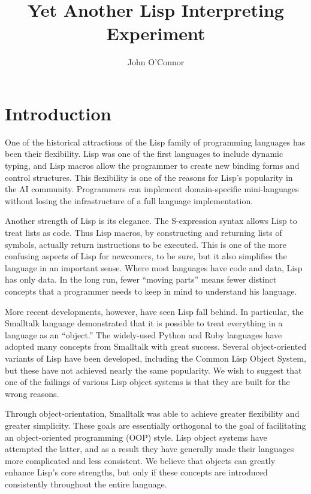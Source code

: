 \documentclass[twocolumn]{article}
\title{Yet Another Lisp Interpreting Experiment}
\author{John O'Connor}
\date{}
\begin{document}
\newcommand{\next}{\operatorname{next}}
\newcommand{\invoke}{\operatorname{invoke}}
\newcommand{\lookup}{\operatorname{lookup}}
\newcommand{\wrap}{\operatorname{wrap}}
\newcommand{\parse}{\operatorname{parse}}

\newcommand{\eval}{\texttt{eval}}
\newcommand{\call}{\texttt{call}}
\newcommand{\msg}{\texttt{msg}}

\newcommand{\lb}{\left<}
\newcommand{\rb}{\right>}

\maketitle

\section*{Introduction}
One of the historical attractions of the Lisp family of programming
languages has been their flexibility. Lisp was one of the first
languages to include dynamic typing, and Lisp macros allow the
programmer to create new binding forms and control structures. This
flexibility is one of the reasons for Lisp's popularity in the AI
community. Programmers can implement domain-specific mini-languages
without losing the infrastructure of a full language implementation.

Another strength of Lisp is its elegance. The S-expression syntax
allows Lisp to treat lists as code. Thus Lisp macros, by constructing
and returning lists of symbols, actually return instructions to be
executed. This is one of the more confusing aspects of Lisp for
newcomers, to be sure, but it also simplifies the language in an
important sense. Where most languages have code and data, Lisp has
only data. In the long run, fewer ``moving parts'' means fewer
distinct concepts that a programmer needs to keep in mind to
understand his language.

More recent developments, however, have seen Lisp fall behind. In
particular, the Smalltalk language demonstrated that it is possible to
treat everything in a language as an ``object.'' The widely-used
Python and Ruby languages have adopted many concepts from Smalltalk
with great success. Several object-oriented variants of Lisp have been
developed, including the Common Lisp Object System, but these have not
achieved nearly the same popularity. We wish to suggest that one of
the failings of various Lisp object systems is that they are built for
the wrong reasons.

Through object-orientation, Smalltalk was able to achieve greater
flexibility and greater simplicity. These goals are essentially
orthogonal to the goal of facilitating an object-oriented programming
(OOP) style. Lisp object systems have attempted the latter, and as a
result they have generally made their languages more complicated and
less consistent. We believe that objects can greatly enhance Lisp's
core strengths, but only if these concepts are introduced consistently
throughout the entire language.
\end{document}
